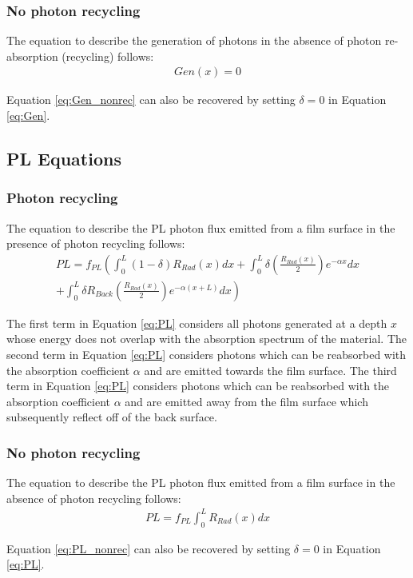 \documentclass[11pt]{article}
\begin{document}
\subsubsection*{No photon recycling}
\par The equation to describe the generation of photons in the absence of photon re-absorption (recycling) follows:
\begin{equation} \label{eq:Gen_nonrec}
	\begin{split}
		Gen(x) = 0
	\end{split}
\end{equation}

\par Equation \ref{eq:Gen_nonrec} can also be recovered by setting $ \delta = 0 $ in Equation \ref{eq:Gen}.

\subsection{PL Equations}
\subsubsection*{Photon recycling}
\par The equation to describe the PL photon flux emitted from a film surface in the presence of photon recycling follows:
\begin{equation} \label{eq:PL}
	\begin{split}
		PL = f_{PL} \left(\int_{0}^{L} (1-\delta)R_{Rad}(x)dx + \int_{0}^{L} \delta \left(\frac{R_{Rad}(x)}{2}\right) e^{-\alpha x} dx 
		\right.\\
		\left.
		+ \int_{0}^{L} \delta R_{Back} \left(\frac{R_{Rad}(x)}{2}\right) e^{-\alpha (x+L)} dx
		\right)
	\end{split}
\end{equation}
\par The first term in Equation \ref{eq:PL} considers all photons generated at a depth $ x $ whose energy does not overlap with the absorption spectrum of the material. The second term in Equation \ref{eq:PL} considers photons which can be reabsorbed with the absorption coefficient $ \alpha $ and are emitted towards the film surface. The third term in Equation \ref{eq:PL} considers photons which can be reabsorbed with the absorption coefficient $ \alpha $ and are emitted away from the film surface which subsequently reflect off of the back surface.
\subsubsection*{No photon recycling}
\par The equation to describe the PL photon flux emitted from a film surface in the absence of photon recycling follows:
\begin{equation} \label{eq:PL_nonrec}
\begin{split}
	PL = f_{PL}\int_{0}^{L} R_{Rad}(x)dx
\end{split}
\end{equation}
 \par Equation \ref{eq:PL_nonrec} can also be recovered by setting $ \delta = 0 $ in Equation \ref{eq:PL}.
	
\end{document}
